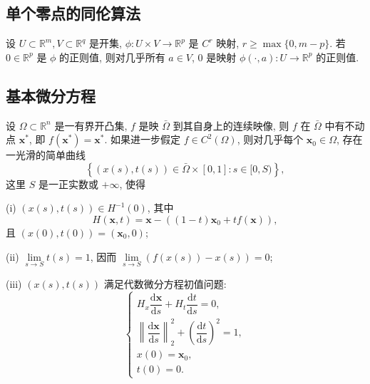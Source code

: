 \subsection{单个零点的同伦算法}

\begin{theorem}
  设 \(U\subset\mathbb{R}^m,V\subset\mathbb{R}^q\) 是开集, \(\phi:U\times V\to\mathbb{R}^p\) 是 \(C^r\) 映射, \(r\ge\max\lbrace 0,m-p\rbrace\). 若 \(0\in\mathbb{R}^p\) 是 \(\phi\) 的正则值, 则对几乎所有 \(a\in V\), \(0\) 是映射 \(\phi(\cdot,a):U\to\mathbb{R}^p\) 的正则值.
\end{theorem}

\subsection{基本微分方程}

\begin{theorem}
  设 \(\Omega\subset\mathbb{R}^n\) 是一有界开凸集, \(f\) 是映 \(\bar\Omega\) 到其自身上的连续映像, 则 \(f\) 在 \(\bar\Omega\) 中有不动点 \(\boldsymbol{x}^*\), 即 \(f \left(\boldsymbol{x}^*\right)=\boldsymbol{x}^*\). 如果进一步假定 \(f\in C^2(\Omega)\), 则对几乎每个 \(\boldsymbol{x}_0\in\Omega\), 存在一光滑的简单曲线
  \begin{equation*}
    \left\lbrace (x(s),t(s))\in\bar \Omega\times [0,1]: s\in[0,S)\right\rbrace,
  \end{equation*}
  这里 \(S\) 是一正实数或 \(+\infty\), 使得

  (i) \((x(s),t(s))\in H^{-1}(0)\), 其中
  \begin{equation*}
    H(\boldsymbol{x},t)=\boldsymbol{x}-((1-t)\boldsymbol{x}_0+tf(\boldsymbol{x})),
  \end{equation*}
  且 \((x(0),t(0))=(\boldsymbol{x}_0,0)\);

  (ii) \(\lim\limits_{s\to S} t(s)=1\), 因而 \(\lim\limits_{s\to S} (f(x(s))-x(s))=0\);

  (iii) \((x(s),t(s))\) 满足代数微分方程初值问题:
  \begin{equation}
    \begin{cases}
      H_x\dfrac{\mathrm{d} \boldsymbol{x}}{\mathrm{d} s}+H_t \dfrac{\mathrm{d} t}{\mathrm{d} s}=0, \\
      \left\lVert \dfrac{\mathrm{d} \boldsymbol{x}}{\mathrm{d} s}\right\rVert_2^2+\left(\dfrac{\mathrm{d} t}{\mathrm{d} s}\right)^2=1, \\
      x(0)=\boldsymbol{x}_0, \\
      t(0)=0.
    \end{cases}
    \label{eq:homotopy_basic_differential_equation}
  \end{equation}
\end{theorem}

